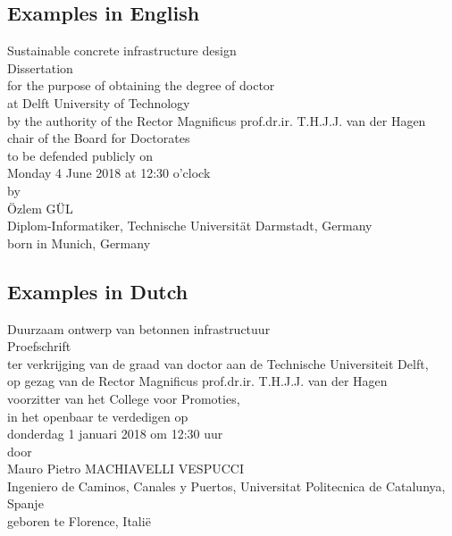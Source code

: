 \subsection*{Examples in English}
\begin{center}
Sustainable concrete infrastructure design \\[1em]
Dissertation \\[1em]
for the purpose of obtaining the degree of doctor \\[0.5em]
at Delft University of Technology \\[0.5em]
by the authority of the Rector Magnificus prof.dr.ir. T.H.J.J. van der Hagen \\[0.5em]
chair of the Board for Doctorates \\[1em]
to be defended publicly on \\[0.5em]
Monday 4 June 2018 at 12:30 o’clock \\[1em]
by \\[1em]
Özlem GÜL \\[0.5em]
Diplom-Informatiker, Technische Universität Darmstadt, Germany \\[0.5em]
born in Munich, Germany
\end{center}

\subsection*{Examples in Dutch}
\begin{center}
Duurzaam ontwerp van betonnen infrastructuur \\[1em]
Proefschrift \\[1em]
ter verkrijging van de graad van doctor aan de Technische Universiteit Delft, \\[0.5em]
op gezag van de Rector Magnificus prof.dr.ir. T.H.J.J. van der Hagen \\[0.5em]
voorzitter van het College voor Promoties, \\[1em]
in het openbaar te verdedigen op \\[0.5em]
donderdag 1 januari 2018 om 12:30 uur \\[1em]
door \\[1em]
Mauro Pietro MACHIAVELLI VESPUCCI \\[0.5em]
Ingeniero de Caminos, Canales y Puertos, Universitat Politecnica de Catalunya, Spanje \\[0.5em]
geboren te Florence, Italië
\end{center}

